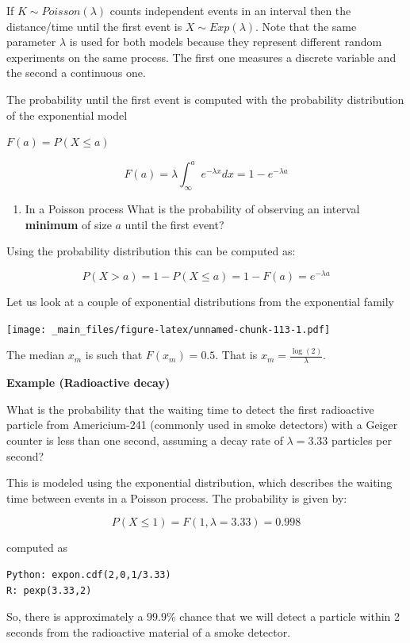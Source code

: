 \documentclass[
]{book}
\providecommand{\tightlist}{%
  \setlength{\itemsep}{0pt}\setlength{\parskip}{0pt}}
\begin{document}
If \(K \sim Poisson(\lambda)\) counts independent events in an interval then the distance/time until the first event is \(X \sim Exp(\lambda)\). Note that the same parameter \(\lambda\) is used for both models because they represent different random experiments on the same process. The first one measures a discrete variable and the second a continuous one.

The probability until the first event is computed with the probability distribution of the exponential model

\(F(a)=P(X \leq a)\)

\[F(a)=\lambda \int_\infty^a e^{-\lambda x}dx=1-e^{-\lambda a}\]

\begin{enumerate}
\def\labelenumi{\arabic{enumi})}
\setcounter{enumi}{1}
\tightlist
\item
  In a Poisson process What is the probability of observing an interval \textbf{minimum} of size \(a\) until the first event?
\end{enumerate}

Using the probability distribution this can be computed as:

\[P(X > a)=1- P(X \leq a)= 1- F(a) = e^{-\lambda a}\]

Let us look at a couple of exponential distributions from the exponential family

\texttt{[image: \_main\_files/figure-latex/unnamed-chunk-113-1.pdf]}

The median \(x_m\) is such that \(F(x_m)=0.5\). That is \(x_m=\frac{\log(2)}{\lambda}\).

\textbf{Example (Radioactive decay)}

What is the probability that the waiting time to detect the first radioactive particle from Americium-241 (commonly used in smoke detectors) with a Geiger counter is less than one second, assuming a decay rate of
\(\lambda = 3.33\) particles per second?

This is modeled using the exponential distribution, which describes the waiting time between events in a Poisson process. The probability is given by:

\[P(X \le 1)=F(1,\lambda=3.33)=0.998\]

computed as

\begin{verbatim}
Python: expon.cdf(2,0,1/3.33)
R: pexp(3.33,2)
\end{verbatim}

So, there is approximately a \(99.9\%\) chance that we will detect a particle within 2 seconds from the radioactive material of a smoke detector.
\end{document}
